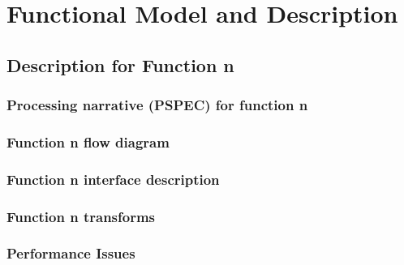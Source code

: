 \documentclass{article}
\begin{document}
\section{Functional Model and Description}

\subsection{Description for Function n}

\subsubsection{Processing narrative (PSPEC) for function n}

\subsubsection{Function n flow diagram}

\subsubsection{Function n interface description}

\subsubsection{Function n transforms}





\subsubsection{Performance Issues}
\end{document}
